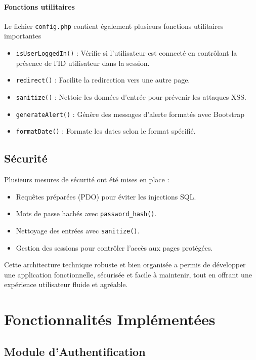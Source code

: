 \documentclass[a4paper,12pt]{article}
\begin{document}
\paragraph{Fonctions utilitaires}
Le fichier \texttt{config.php} contient également plusieurs fonctions utilitaires importantes
\begin{itemize}
    \item \texttt{isUserLoggedIn()} : Vérifie si l'utilisateur est connecté en contrôlant la présence de
l'ID utilisateur dans la session.
    \item \texttt{redirect()} : Facilite la redirection vers une autre page.
    \item \texttt{sanitize()} : Nettoie les données d'entrée pour prévenir les attaques XSS.
    \item \texttt{generateAlert()} : Génère des messages d'alerte formatés avec Bootstrap
    \item \texttt{formatDate()} : Formate les dates selon le format spécifié.
\end{itemize}

\subsection{Sécurité}
Plusieurs mesures de sécurité ont été mises en place :
\begin{itemize}
    \item Requêtes préparées (PDO) pour éviter les injections SQL.
    \item Mots de passe hachés avec \texttt{password\_hash()}.
    \item Nettoyage des entrées avec \texttt{sanitize()}.
    \item Gestion des sessions pour contrôler l'accès aux pages protégées.
\end{itemize}

Cette architecture technique robuste et bien organisée a permis de développer une
application fonctionnelle, sécurisée et facile à maintenir, tout en offrant une expérience
utilisateur fluide et agréable.

\section{Fonctionnalités Implémentées}

\subsection{Module d'Authentification}
\end{document}
